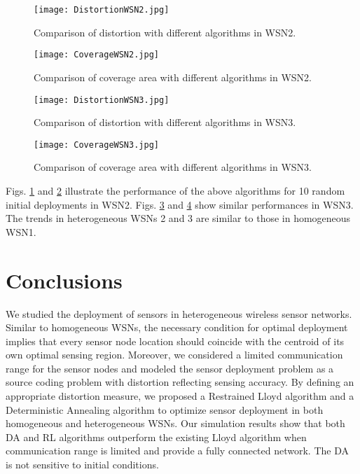 \documentclass[journal,draftcls,onecolumn,12pt,twoside, narroweqnarray]{IEEEtran}
\begin{document}
\begin{figure}[!t]
\centering
\texttt{[image: DistortionWSN2.jpg]}
\setlength{\belowcaptionskip}{-10pt} \caption{Comparison of distortion with different algorithms in WSN2.}
\label{distortion in heterogeneous sensor network2}
\end{figure}
\begin{figure}[!t]
\centering
\texttt{[image: CoverageWSN2.jpg]}
\setlength{\belowcaptionskip}{-10pt} \caption{Comparison of coverage area with different algorithms in WSN2.}
\label{coverage in heterogeneous sensor network2}
\end{figure}

\begin{figure}[!t]
\centering
\texttt{[image: DistortionWSN3.jpg]}
\setlength{\belowcaptionskip}{-10pt} \caption{Comparison of distortion with different algorithms in WSN3.}
\label{distortion in heterogeneous sensor network3}
\end{figure}
\begin{figure}[!t]
\centering
\texttt{[image: CoverageWSN3.jpg]}
\setlength{\belowcaptionskip}{-10pt} \caption{Comparison of coverage area with different algorithms in WSN3.}
\label{coverage in heterogeneous sensor network3}
\end{figure}

Figs. \ref{distortion in heterogeneous sensor network2} and \ref{coverage in heterogeneous sensor network2} illustrate the performance of the above algorithms for 10 random initial deployments in WSN2. Figs. \ref{distortion in heterogeneous sensor network3} and \ref{coverage in heterogeneous sensor network3} show similar performances in WSN3. The trends in  heterogeneous WSNs 2 and 3 are similar to those in homogeneous WSN1.


















\section{Conclusions}
We studied the deployment of sensors in heterogeneous wireless sensor networks.
Similar to homogeneous WSNs, the
necessary condition for optimal deployment implies that every sensor node location
should coincide with the centroid of its own optimal sensing
region. Moreover, we considered a limited
communication range for the sensor nodes and modeled the sensor deployment
problem as a source coding problem with distortion reflecting
sensing accuracy. By defining an appropriate distortion measure, we
proposed a Restrained Lloyd algorithm and a Deterministic
Annealing algorithm to optimize sensor deployment in both
homogeneous and heterogeneous WSNs. Our simulation results
show that both DA and RL algorithms outperform the existing
Lloyd algorithm when communication range is limited and provide a fully connected network. The DA is not sensitive to initial conditions.
\end{document}
